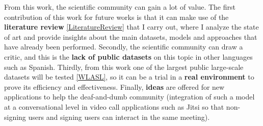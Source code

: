 From this work, the scientific community can gain a lot of value. 
The first contribution of this work for future works is that it can make use of the \textbf{literature review} \ref{LiteratureReview} that I carry out, where I analyze 
the state of art and provide insights about the main datasets, models and approaches that have already been performed. 
Secondly, the scientific community can draw a critic, and this is the \textbf{lack of public datasets} on this topic in other languages 
such as Spanish. 
Thirdly, from this work one of the largest public large-scale datasets will be tested \ref{WLASL}, so it can be a trial in a \textbf{real environment} 
to prove its efficiency and effectiveness.
Finally, \textbf{ideas} are offered for new applications to help the deaf-and-dumb community (integration of such a model at a conversational 
level in video call applications such as Jitsi \cite{Jitsi} so that non-signing users and signing users can interact in the same meeting).